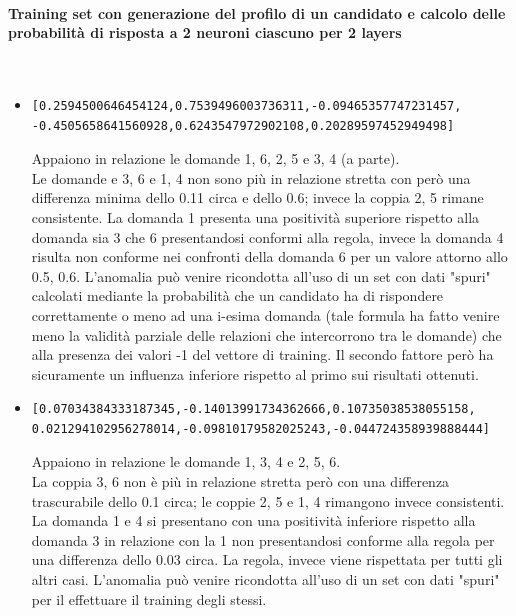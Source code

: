 \paragraph{Training set con generazione del profilo di un candidato e calcolo delle probabilit\`a di risposta a  2 neuroni ciascuno per 2 layers}\mbox{}
\label{Training set con generazione del profilo di un candidato e calcolo delle probabilita di risposta a  2 neuroni}
\\
\noindent
\begin{itemize}
\item  \begin{verbatim}[0.2594500646454124,0.7539496003736311,-0.09465357747231457,
-0.4505658641560928,0.6243547972902108,0.20289597452949498]\end{verbatim}
Appaiono in relazione le domande 1, 6, 2, 5 e 3, 4 (a parte).\\
Le domande e 3, 6 e 1, 4 non sono pi\`u in relazione stretta con per\`o una differenza minima dello 0.11 circa e dello 0.6; invece la coppia 2, 5 rimane consistente. La domanda 1 presenta una positivit\`a superiore rispetto alla domanda sia 3 che 6 presentandosi conformi alla regola, invece la domanda 4 risulta non conforme nei confronti della domanda 6 per un valore attorno allo 0.5, 0.6. L'anomalia pu\`o venire ricondotta all'uso di un set con dati "spuri" calcolati mediante la probabilit\`a che un candidato ha di rispondere correttamente o meno ad una i-esima domanda (tale formula ha fatto venire meno la validit\`a parziale delle relazioni che intercorrono tra le domande) che alla presenza dei valori -1 del vettore di training. Il secondo fattore per\`o ha sicuramente un influenza inferiore rispetto al primo sui risultati ottenuti.

\item  \begin{verbatim}[0.07034384333187345,-0.14013991734362666,0.10735038538055158,
0.021294102956278014,-0.09810179582025243,-0.044724358939888444]\end{verbatim}
Appaiono in relazione le domande 1, 3, 4 e 2, 5, 6.\\
La coppia 3, 6 non \`e pi\`u in relazione stretta per\`o con una differenza trascurabile dello 0.1 circa; le coppie 2, 5 e 1, 4 rimangono invece consistenti. La domanda 1 e 4 si presentano con una positivit\`a inferiore rispetto alla domanda 3 in relazione con la 1 non presentandosi conforme alla regola per una differenza dello 0.03 circa. La regola, invece viene rispettata per tutti gli altri casi. L'anomalia pu\`o venire ricondotta all'uso di un set con dati "spuri" per il effettuare il training degli stessi.


\end{itemize}
